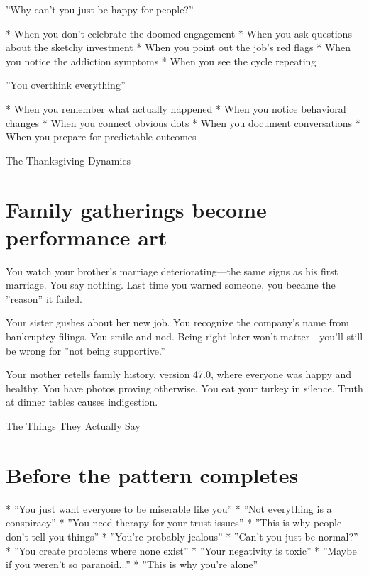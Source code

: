 \documentclass[12pt,oneside]{book}
\begin{document}
''Why can't you just be happy for people?''

                    * When you don't celebrate the doomed engagement
                    * When you ask questions about the sketchy investment
                    * When you point out the job's red flags
                    * When you notice the addiction symptoms
                    * When you see the cycle repeating

''You overthink everything''

                    * When you remember what actually happened
                    * When you notice behavioral changes
                    * When you connect obvious dots
                    * When you document conversations
                    * When you prepare for predictable outcomes

The Thanksgiving Dynamics

\section{Family gatherings become performance art}

You watch your brother's marriage deteriorating---the same signs as his first marriage. You say nothing. Last time you warned someone, you became the ''reason'' it failed.

Your sister gushes about her new job. You recognize the company's name from bankruptcy filings. You smile and nod. Being right later won't matter---you'll still be wrong for ''not being supportive.''

Your mother retells family history, version 47.0, where everyone was happy and healthy. You have photos proving otherwise. You eat your turkey in silence. Truth at dinner tables causes indigestion.

The Things They Actually Say

\section{Before the pattern completes}

                    * ''You just want everyone to be miserable like you''
                    * ''Not everything is a conspiracy''
                    * ''You need therapy for your trust issues''
                    * ''This is why people don't tell you things''
                    * ''You're probably jealous''
                    * ''Can't you just be normal?''
                    * ''You create problems where none exist''
                    * ''Your negativity is toxic''
                    * ''Maybe if you weren't so paranoid...''
                    * ''This is why you're alone''
\end{document}
